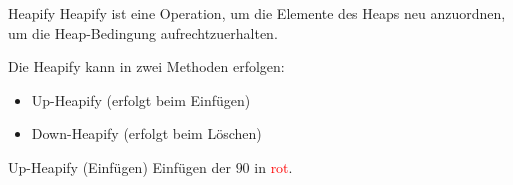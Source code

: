 \documentclass[german]{../spicker}
\begin{document}
\begin{defi}{Heapify}
    Heapify ist eine Operation, um die Elemente des Heaps neu anzuordnen, um die Heap-Bedingung aufrechtzuerhalten.

    Die Heapify kann in zwei Methoden erfolgen:
    \begin{itemize}
        \item Up-Heapify (erfolgt beim Einfügen)
        \item Down-Heapify (erfolgt beim Löschen)
    \end{itemize}

\end{defi}

\begin{algo}{Up-Heapify (Einfügen)}
    Einfügen der $90$ in \textcolor{red}{rot}.

    \vspace{1em}
    \begin{center}
        \hspace{1em}
        \scalebox{0.9}{
            \begin{forest}

\end{forest}}
\end{center}
\end{algo}
\end{document}
